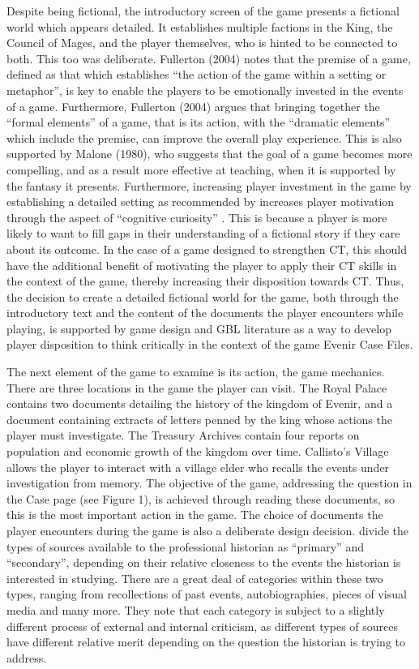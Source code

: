 \documentclass{l4proj}
\begin{document}
Despite being fictional, the introductory screen of the game presents a fictional world which appears detailed. It establishes multiple factions in the King, the Council of Mages, and the player themselves, who is hinted to be connected to both. This too was deliberate. Fullerton (2004) notes that the premise of a game, defined as that which establishes “the action of the game within a setting or metaphor”, is key to enable the players to be emotionally invested in the events of a game. Furthermore, Fullerton (2004) argues that bringing together the “formal elements” of a game, that is its action, with the “dramatic elements” which include the premise, can improve the overall play experience. This is also supported by Malone (1980), who suggests that the goal of a game becomes more compelling, and as a result more effective at teaching, when it is supported by the fantasy it presents. Furthermore, increasing player investment in the game by establishing a detailed setting as recommended by \citet{fullerton2004game} increases player motivation through the aspect of “cognitive curiosity” \citep{malone1980makes}. This is because a player is more likely to want to fill gaps in their understanding of a fictional story if they care about its outcome. In the case of a game designed to strengthen CT, this should have the additional benefit of motivating the player to apply their CT skills in the context of the game, thereby increasing their disposition towards CT. Thus, the decision to create a detailed fictional world for the game, both through the introductory text and the content of the documents the player encounters while playing, is supported by game design and GBL literature as a way to develop player disposition to think critically in the context of the game Evenir Case Files.  

The next element of the game to examine is its action, the game mechanics. There are three locations in the game the player can visit. The Royal Palace contains two documents detailing the history of the kingdom of Evenir, and a document containing extracts of letters penned by the king whose actions the player must investigate. The Treasury Archives contain four reports on population and economic growth of the kingdom over time. Callisto’s Village allows the player to interact with a village elder who recalls the events under investigation from memory. The objective of the game, addressing the question in the Case page (see Figure 1), is achieved through reading these documents, so this is the most important action in the game. The choice of documents the player encounters during the game is also a deliberate design decision. \citet{tosh2006pursuit} divide the types of sources available to the professional historian as “primary” and “secondary”, depending on their relative closeness to the events the historian is interested in studying. There are a great deal of categories within these two types, ranging from recollections of past events, autobiographies, pieces of visual media and many more. They note that each category is subject to a slightly different process of external and internal criticism, as different types of sources have different relative merit depending on the question the historian is trying to address. 
\end{document}
